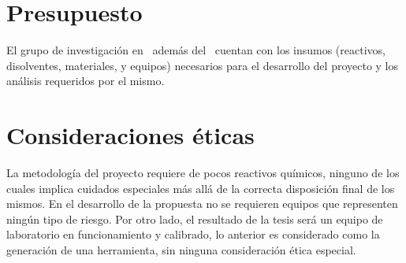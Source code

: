 \section{Presupuesto}
	 El grupo de investigación en \groupname\ además del \deptname\ cuentan con los insumos (reactivos, disolventes, materiales, y equipos) necesarios para el desarrollo del proyecto y los análisis requeridos por el mismo.
	 
	 
	 

\section{Consideraciones éticas}
	La metodología del proyecto requiere de pocos reactivos químicos, ninguno de los cuales implica cuidados especiales más allá de la correcta disposición final de los mismos. En el desarrollo de la propuesta no se requieren equipos que representen ningún tipo de riesgo. Por otro lado, el resultado de la tesis será un equipo de laboratorio en funcionamiento y calibrado, lo anterior es considerado como la generación de una herramienta, sin ninguna consideración ética especial.